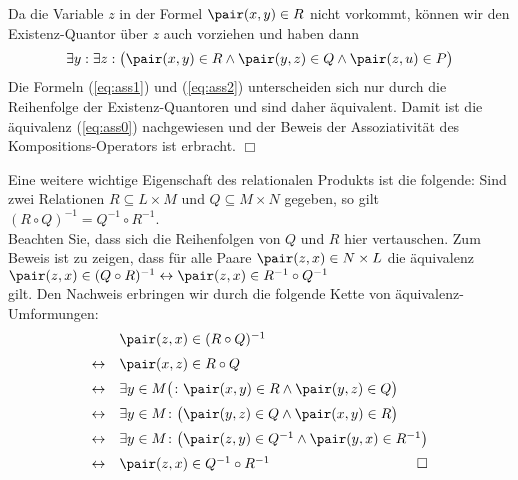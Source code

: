 Da die Variable $z$ in der Formel $\pair(x,y) \in R$ nicht vorkommt, k\"{o}nnen wir den
Existenz-Quantor \"{u}ber $z$ auch vorziehen und haben dann
\begin{equation}
  \label{eq:ass2}
  \exists y: \exists z: \bigl(\pair(x,y) \in R \wedge \pair(y,z) \in Q \wedge \pair(z,u) \in P\bigr)
\end{equation}
Die Formeln (\ref{eq:ass1}) und (\ref{eq:ass2}) unterscheiden sich nur durch die
Reihenfolge der Existenz-Quantoren und sind daher \"{a}quivalent.  Damit ist die \"{a}quivalenz
(\ref{eq:ass0}) nachgewiesen und der Beweis der Assoziativit\"{a}t des Kompositions-Operators
ist erbracht.  \hspace*{\fill} $\Box$

Eine weitere wichtige Eigenschaft des relationalen Produkts ist die folgende: Sind
zwei Relationen $R \subseteq L \times M$ und $Q \subseteq M \times N$ gegeben, so gilt \\[0.2cm]
\hspace*{1.3cm} $(R \circ Q)^{-1} = Q^{-1} \circ R^{-1}$. \\[0.2cm]
Beachten Sie, dass sich die Reihenfolgen von $Q$ und $R$ hier vertauschen.  Zum Beweis
ist zu zeigen, dass f\"{u}r alle Paare $\pair(z,x) \in N \times L$ die  \"{a}quivalenz \\[0.2cm]
\hspace*{1.3cm} $\pair(z,x) \in (Q \circ R)^{-1} \leftrightarrow \pair(z,x) \in R^{-1} \circ Q^{-1}$ \\[0.2cm]
gilt.  Den Nachweis erbringen wir durch die folgende Kette von \"{a}quivalenz-Umformungen: 
\[ 
\begin{array}{cl}
                & \pair(z,x) \in (R \circ Q)^{-1}                                             \\[0.2cm]
\leftrightarrow & \pair(x,z) \in R \circ Q                                                    \\[0.2cm]
\leftrightarrow & \exists y \in M \bigl(\colon \pair(x,y) \in R \wedge \pair(y,z) \in Q\bigr) \\[0.2cm]
\leftrightarrow & \exists y \in M \colon \bigl(\pair(y,z) \in Q \wedge \pair(x,y) \in R\bigr) \\[0.2cm]
\leftrightarrow & \exists y \in M \colon \bigl(\pair(z,y) \in Q^{-1} \wedge \pair(y,x) \in R^{-1}\bigr) 
                  \\[0.2cm]
\leftrightarrow & \pair(z,x) \in Q^{-1} \circ R^{-1}   \hspace*{\fill} \Box                                       
\end{array}
\]
\vspace{0.2cm}

